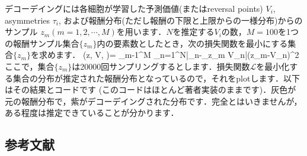 デコーデイングには各細胞が学習した予測価値(またはreversal points) $V_i$, asymmetries $\tau_i$, および報酬分布(ただし報酬の下限と上限からの一様分布)からのサンプル $z_m (m=1,2,\cdots,
M)$を用います．$N$を推定する$V_i$の数，$M=100$を1つの報酬サンプル集合$\{z_m\}$内の要素数としたとき，次の損失関数を最小にする集合$\{z_m\}$を求めます．  (z, V, \tau)= \sum_{m-1}^{M} \sum_{n=1}^{N}\left|\tau_{n}-_{z_{m} \leq
V_{n}}\right|\left(z_{m}-V_{n}\right)^{2}  ここで，集合$\{z_m\}$は20000回サンプリングするとします．損失関数$\mathcal{L}$を最小化する集合の分布が推定された報酬分布となっているので，それをplotします．以下はその結果とコードです
(このコードはほとんど著者実装のままです)．灰色が元の報酬分布で，紫がデコーデイングされた分布です．完全とはいきませんが，ある程度は推定できていることが分かります．
\subsection{参考文献}
